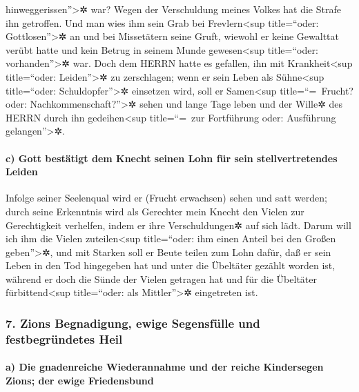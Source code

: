 hinweggerissen''\textgreater✲ war? Wegen der Verschuldung meines Volkes
hat die Strafe ihn getroffen. Und man wies ihm sein Grab
bei Frevlern\textless sup title=``oder: Gottlosen''\textgreater✲ an und
bei Missetätern seine Gruft, wiewohl er keine Gewalttat verübt hatte und
kein Betrug in seinem Munde gewesen\textless sup title=``oder:
vorhanden''\textgreater✲ war. Doch dem HERRN hatte es
gefallen, ihn mit Krankheit\textless sup title=``oder:
Leiden''\textgreater✲ zu zerschlagen; wenn er sein Leben als
Sühne\textless sup title=``oder: Schuldopfer''\textgreater✲ einsetzen
wird, soll er Samen\textless sup title=``=~Frucht? oder:
Nachkommenschaft?''\textgreater✲ sehen und lange Tage leben und der
Wille✲ des HERRN durch ihn gedeihen\textless sup title=``=~zur
Fortführung oder: Ausführung gelangen''\textgreater✲.

\hypertarget{c-gott-bestuxe4tigt-dem-knecht-seinen-lohn-fuxfcr-sein-stellvertretendes-leiden}{%
\paragraph{c) Gott bestätigt dem Knecht seinen Lohn für sein
stellvertretendes
Leiden}\label{c-gott-bestuxe4tigt-dem-knecht-seinen-lohn-fuxfcr-sein-stellvertretendes-leiden}}

Infolge seiner Seelenqual wird er (Frucht erwachsen)
sehen und satt werden; durch seine Erkenntnis wird als Gerechter mein
Knecht den Vielen zur Gerechtigkeit verhelfen, indem er ihre
Verschuldungen✲ auf sich lädt. Darum will ich ihm die
Vielen zuteilen\textless sup title=``oder: ihm einen Anteil bei den
Großen geben''\textgreater✲, und mit Starken soll er Beute teilen zum
Lohn dafür, daß er sein Leben in den Tod hingegeben hat und unter die
Übeltäter gezählt worden ist, während er doch die Sünde der Vielen
getragen hat und für die Übeltäter fürbittend\textless sup title=``oder:
als Mittler''\textgreater✲ eingetreten ist.

\hypertarget{zions-begnadigung-ewige-segensfuxfclle-und-festbegruxfcndetes-heil}{%
\subsubsection{7. Zions Begnadigung, ewige Segensfülle und
festbegründetes
Heil}\label{zions-begnadigung-ewige-segensfuxfclle-und-festbegruxfcndetes-heil}}

\hypertarget{a-die-gnadenreiche-wiederannahme-und-der-reiche-kindersegen-zions-der-ewige-friedensbund}{%
\paragraph{a) Die gnadenreiche Wiederannahme und der reiche Kindersegen
Zions; der ewige
Friedensbund}\label{a-die-gnadenreiche-wiederannahme-und-der-reiche-kindersegen-zions-der-ewige-friedensbund}}


